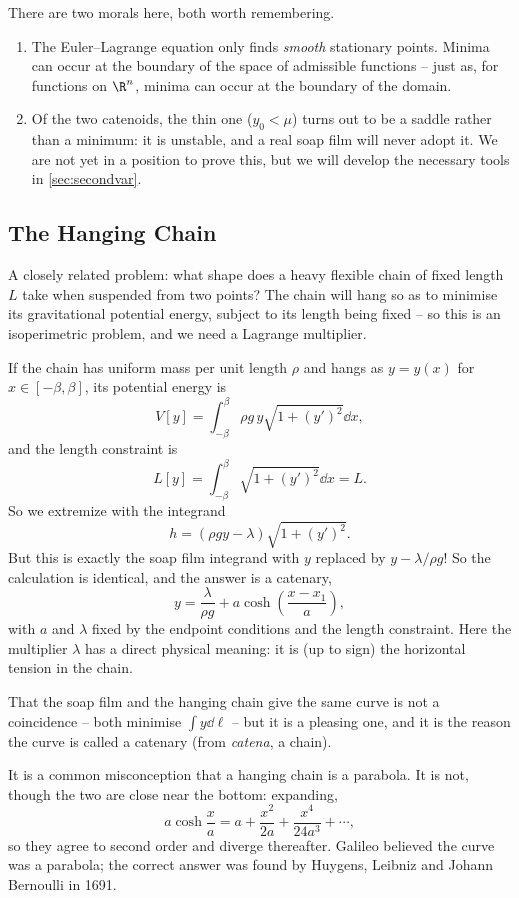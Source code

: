 \documentclass[a4paper]{scrartcl}
\begin{document}
There are two morals here, both worth remembering.
\begin{enumerate}[label=(\roman*)]
	\item The Euler--Lagrange equation only finds \emph{smooth} stationary points. Minima can occur at the boundary of the space of admissible functions -- just as, for functions on $\R^n$, minima can occur at the boundary of the domain.
	\item Of the two catenoids, the thin one ($y_0 < \mu$) turns out to be a saddle rather than a minimum: it is unstable, and a real soap film will never adopt it. We are not yet in a position to prove this, but we will develop the necessary tools in \autoref{sec:secondvar}.
\end{enumerate}

\subsection{The Hanging Chain}

A closely related problem: what shape does a heavy flexible chain of fixed length $L$ take when suspended from two points? The chain will hang so as to minimise its gravitational potential energy, subject to its length being fixed -- so this is an isoperimetric problem, and we need a Lagrange multiplier.

If the chain has uniform mass per unit length $\rho$ and hangs as $y = y(x)$ for $x \in [-\beta, \beta]$, its potential energy is
$$
V[y] = \int_{-\beta}^{\beta}\rho g\, y \sqrt{1 + (y')^2}\dd x,
$$
and the length constraint is
$$
L[y] = \int_{-\beta}^{\beta}\sqrt{1 + (y')^2}\dd x = L.
$$
So we extremize with the integrand
$$
h = (\rho g y - \lambda)\sqrt{1 + (y')^2}.
$$
But this is exactly the soap film integrand with $y$ replaced by $y - \lambda/\rho g$! So the calculation is identical, and the answer is a catenary,
$$
y = \frac{\lambda}{\rho g} + a \cosh\left(\frac{x - x_1}{a}\right),
$$
with $a$ and $\lambda$ fixed by the endpoint conditions and the length constraint. Here the multiplier $\lambda$ has a direct physical meaning: it is (up to sign) the horizontal tension in the chain.

That the soap film and the hanging chain give the same curve is not a coincidence -- both minimise $\int y \dd\ell$ -- but it is a pleasing one, and it is the reason the curve is called a catenary (from \emph{catena}, a chain).

It is a common misconception that a hanging chain is a parabola. It is not, though the two are close near the bottom: expanding,
$$
a\cosh\frac{x}{a} = a + \frac{x^2}{2a} + \frac{x^4}{24a^3} + \cdots,
$$
so they agree to second order and diverge thereafter. Galileo believed the curve was a parabola; the correct answer was found by Huygens, Leibniz and Johann Bernoulli in 1691.
\end{document}

